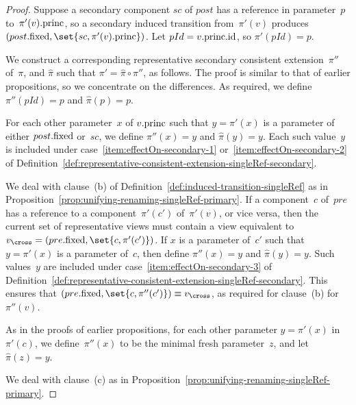 
\begin{proof}
Suppose a secondary component $sc$ of $post$ has a reference in parameter~$p$
to~$\pi'(v).\mathrm{princ}$, so a secondary induced transition from~$\pi'(v)$ produces
$(post.\fixed, \set{sc, \pi'(v).\princ})$.  Let $pId = v.\mathrm{princ}.\mathrm{id}$, so
$\pi'(pId) = p$.

We construct a corresponding representative secondary consistent
extension~$\pi''$ of~$\pi$, and $\hat\pi$ such that $\pi' = \hat\pi \circ
\pi''$, as follows.  The proof is similar to that of earlier propositions, so
we concentrate on the differences.  As required, we define $\pi''(pId) = p$
and $\hat\pi(p) = p$.

For each other parameter~$x$ of $v.\mathrm{princ}$ such that $y = \pi'(x)$ is a
parameter of either $post.\mathrm{fixed}$ or~$sc$, we define $\pi''(x) = y$ and
$\hat\pi(y) = y$.  Each such value~$y$ is included under
case~\ref{item:effectOn-secondary-1} or~\ref{item:effectOn-secondary-2} of
Definition~\ref{def:representative-consistent-extension-singleRef-secondary}.

We deal with clause~(b) of Definition~\ref{def:induced-transition-singleRef}
as in Proposition~\ref{prop:unifying-renaming-singleRef-primary}.  If a
component~$c$ of~$pre$ has a reference to a component~$\pi'(c')$ of~$\pi'(v)$,
or vice versa, then the current set of representative views must contain a
view equivalent to $v_\cross = (pre.\fixed, \set{c,\pi'(c')})$.  If $x$ is a
parameter of~$c'$ such that $y = \pi'(x)$ is a parameter of~$c$, then define
$\pi''(x) = y$ and $\hat\pi(y) = y$.  Such values~$y$ are included under
case~\ref{item:effectOn-secondary-3} of
Definition~\ref{def:representative-consistent-extension-singleRef-secondary}.
This ensures that $(pre.\fixed, \set{c,\pi''(c')}) \equiv v_\cross$, as
required for clause~(b) for~$\pi''(v)$.  

As in the proofs of earlier propositions, for each other parameter $y =
\pi'(x)$ in~$\pi'(c)$, we define~$\pi''(x)$ to be the minimal fresh
parameter~$z$, and let $\hat\pi(z) = y$.

We deal with clause~(c) as in
Proposition~\ref{prop:unifying-renaming-singleRef-primary}.
\end{proof}


